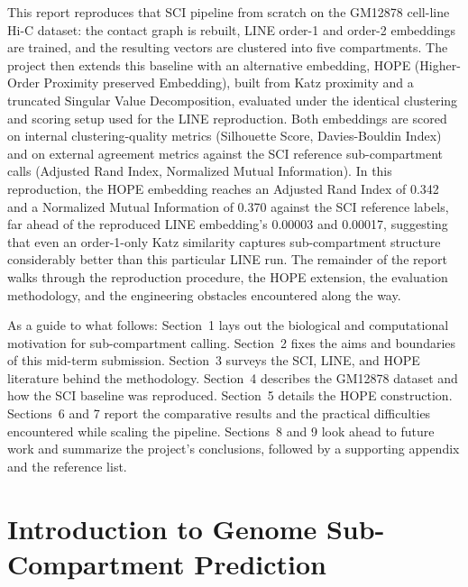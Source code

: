\documentclass[12pt]{article}
\begin{document}
This report reproduces that SCI pipeline from scratch on the GM12878 cell-line Hi-C dataset:
the contact graph is rebuilt, LINE order-1 and order-2 embeddings are trained, and the resulting
vectors are clustered into five compartments. The project then extends this baseline with an
alternative embedding, HOPE (Higher-Order Proximity preserved Embedding), built from Katz
proximity and a truncated Singular Value Decomposition, evaluated under the identical clustering
and scoring setup used for the LINE reproduction. Both embeddings are scored on internal
clustering-quality metrics (Silhouette Score, Davies-Bouldin Index) and on external agreement
metrics against the SCI reference sub-compartment calls (Adjusted Rand Index, Normalized Mutual
Information). In this reproduction, the HOPE embedding reaches an Adjusted Rand Index of 0.342
and a Normalized Mutual Information of 0.370 against the SCI reference labels, far ahead of the
reproduced LINE embedding's 0.00003 and 0.00017, suggesting that even an order-1-only Katz
similarity captures sub-compartment structure considerably better than this particular LINE run.
The remainder of the report walks through the reproduction procedure, the HOPE extension, the
evaluation methodology, and the engineering obstacles encountered along the way.

As a guide to what follows: Section~1 lays out the biological and computational motivation for
sub-compartment calling. Section~2 fixes the aims and boundaries of this mid-term submission.
Section~3 surveys the SCI, LINE, and HOPE literature behind the methodology. Section~4 describes
the GM12878 dataset and how the SCI baseline was reproduced. Section~5 details the HOPE
construction. Sections~6 and 7 report the comparative results and the practical difficulties
encountered while scaling the pipeline. Sections~8 and 9 look ahead to future work and summarize
the project's conclusions, followed by a supporting appendix and the reference list.

\clearpage

\section{Introduction to Genome Sub-Compartment Prediction}
\end{document}
